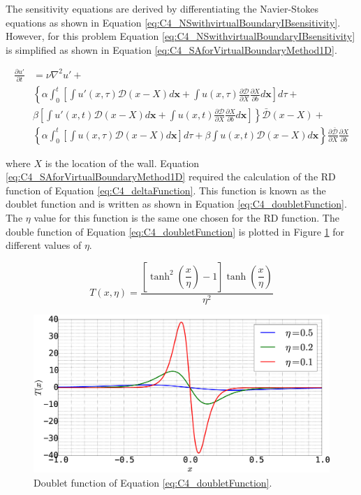 The sensitivity equations are derived by differentiating the Navier-Stokes equations as shown in Equation \eqref{eq:C4_NSwithvirtualBoundaryIBsensitivity}. However, for this problem Equation \eqref{eq:C4_NSwithvirtualBoundaryIBsensitivity} is simplified as shown in Equation \eqref{eq:C4_SAforVirtualBoundaryMethod1D}.

\begin{align}\label{eq:C4_SAforVirtualBoundaryMethod1D}
    \frac{\partial u'}{\partial t}
    &= 
    \nu \nabla^2 u' + \nonumber \\
    &\left\{
    \alpha
    \int_0^t
    \left[
        \int u'(x, \tau) \mathcal{D}(x - X) d\mathbf{x} + 
        \int u(x, \tau) \frac{\partial \mathcal{D}}{\partial X} \frac{\partial X}{\partial b} d\mathbf{x}
    \right] d\tau \right.
    + \nonumber \\
    &
    \left.
    \beta
    \left[
    \int u'(x, t) \mathcal{D}(x - X) d\mathbf{x} +
    \int u(x, t) \frac{\partial \mathcal{D}}{\partial X} \frac{\partial X}{\partial b} d\mathbf{x}
    \right]
    \right\} \bar{\mathcal{D}}(x - X) + \nonumber \\
    &\left\{
    \alpha
    \int_0^t
    \left[
        \int u(x, \tau) \mathcal{D}(x - X) d\mathbf{x}
    \right] d\tau
    +
    \beta
    \int u(x, t) \mathcal{D}(x - X) d\mathbf{x}
    \right\}
    \frac{\partial \bar{\mathcal{D}}}{\partial X} \frac{\partial X}{\partial b}
\end{align}

where $X$ is the location of the wall. Equation \eqref{eq:C4_SAforVirtualBoundaryMethod1D} required the calculation of the RD function of Equation \eqref{eq:C4_deltaFunction}. This function is known as the doublet function \cite{kamaraju2009linear} and is written as shown in Equation \eqref{eq:C4_doubletFunction}. The $\eta$ value for this function is the same one chosen for the RD function. The double function of Equation \eqref{eq:C4_doubletFunction} is plotted in Figure \ref{fig:C4_doubletFunction} for different values of $\eta$.

\begin{equation}\label{eq:C4_doubletFunction}
	T(x, \eta) = 
	\frac{\left[ \tanh^{2}{\left(\dfrac{x}{\eta} \right)} - 1 \right] \tanh{\left( \dfrac{x}{\eta} \right)}}{\eta^2} 
\end{equation}

\begin{figure}[H]
	\centering
	\includegraphics[width=12.00cm]{Chapter_4/figure/doubletFunction.eps}
	\caption{Doublet function of Equation \eqref{eq:C4_doubletFunction}.}
	\label{fig:C4_doubletFunction}
\end{figure}

